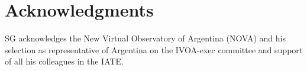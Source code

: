 \documentclass[final,5p,times,twocolumn,authoryear]{elsarticle}
\begin{document}
\section{Acknowledgments}
SG acknowledges the New Virtual Observatory of Argentina (NOVA) and his selection as representative of Argentina on the IVOA-exec committee and support of all his colleagues in the IATE.

%


\end{document}
